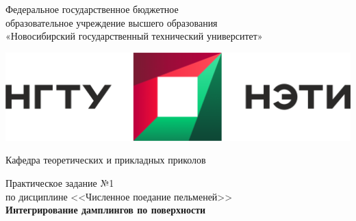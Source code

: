 \documentclass[12pt,a4paper]{article}
\begin{document}
\begin{center}
\begin{large}

\vspace{8mm}



Федеральное государственное бюджетное  \\
образовательное учреждение высшего образования \\
«Новосибирский государственный технический университет» \\

\vspace{12mm}




\includegraphics[scale=0.35]{pic/nstu_emblem_with_title}

\vspace{8mm}


Кафедра теоретических и прикладных приколов

\vspace{4mm}


Практическое задание №1 \\ %
по дисциплине <<Численное поедание пельменей>> \\ %
\textbf{Интегрирование дамплингов по поверхности} %

\vspace{16mm}

\end{large}




\end{center}
\end{document}
